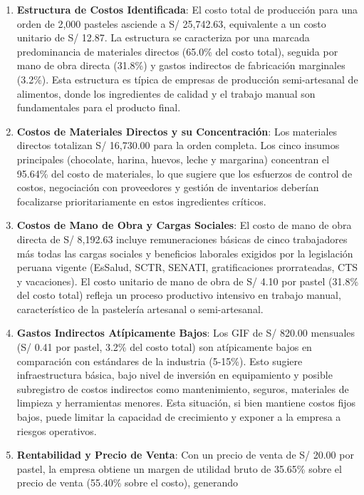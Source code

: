 \documentclass[
  stu,
  floatsintext,
  longtable,
  a4paper,
  nolmodern,
  notxfonts,
  notimes,
  12pt,
  colorlinks=true,linkcolor=blue,citecolor=blue,urlcolor=blue]{apa7}
\begin{document}
\begin{enumerate}
\def\labelenumi{\arabic{enumi}.}
\item
  \textbf{Estructura de Costos Identificada}: El costo total de
  producción para una orden de 2,000 pasteles asciende a S/ 25,742.63,
  equivalente a un costo unitario de S/ 12.87. La estructura se
  caracteriza por una marcada predominancia de materiales directos
  (65.0\% del costo total), seguida por mano de obra directa (31.8\%) y
  gastos indirectos de fabricación marginales (3.2\%). Esta estructura
  es típica de empresas de producción semi-artesanal de alimentos, donde
  los ingredientes de calidad y el trabajo manual son fundamentales para
  el producto final.
\item
  \textbf{Costos de Materiales Directos y su Concentración}: Los
  materiales directos totalizan S/ 16,730.00 para la orden completa. Los
  cinco insumos principales (chocolate, harina, huevos, leche y
  margarina) concentran el 95.64\% del costo de materiales, lo que
  sugiere que los esfuerzos de control de costos, negociación con
  proveedores y gestión de inventarios deberían focalizarse
  prioritariamente en estos ingredientes críticos.
\item
  \textbf{Costos de Mano de Obra y Cargas Sociales}: El costo de mano de
  obra directa de S/ 8,192.63 incluye remuneraciones básicas de cinco
  trabajadores más todas las cargas sociales y beneficios laborales
  exigidos por la legislación peruana vigente (EsSalud, SCTR, SENATI,
  gratificaciones prorrateadas, CTS y vacaciones). El costo unitario de
  mano de obra de S/ 4.10 por pastel (31.8\% del costo total) refleja un
  proceso productivo intensivo en trabajo manual, característico de la
  pastelería artesanal o semi-artesanal.
\item
  \textbf{Gastos Indirectos Atípicamente Bajos}: Los GIF de S/ 820.00
  mensuales (S/ 0.41 por pastel, 3.2\% del costo total) son atípicamente
  bajos en comparación con estándares de la industria (5-15\%). Esto
  sugiere infraestructura básica, bajo nivel de inversión en
  equipamiento y posible subregistro de costos indirectos como
  mantenimiento, seguros, materiales de limpieza y herramientas menores.
  Esta situación, si bien mantiene costos fijos bajos, puede limitar la
  capacidad de crecimiento y exponer a la empresa a riesgos operativos.
\item
  \textbf{Rentabilidad y Precio de Venta}: Con un precio de venta de S/
  20.00 por pastel, la empresa obtiene un margen de utilidad bruto de
  35.65\% sobre el precio de venta (55.40\% sobre el costo), generando

\end{enumerate}
\end{document}
